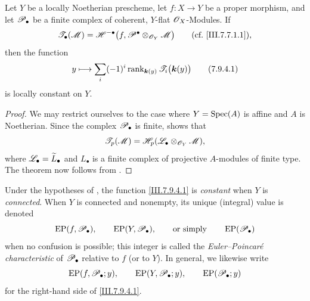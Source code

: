 \begin{theorem}[7.9.4]
\label{III.7.9.4}
Let $Y$ be a locally Noetherian prescheme, let
$f:X\to Y$ be a proper morphism, and let
$\mathscr{P}_\bullet$ be a finite complex of coherent,
$Y$-flat $\mathscr{O}_X$-Modules.  If
\[
  \mathscr{T}_\bullet(\mathscr{M})
  =
  \mathscr{H}^{-\bullet}
    \bigl(f,\mathscr{P}^\bullet
      \otimes_{\mathscr{O}_Y}\mathscr{M}\bigr)
  \qquad\text{\rm(cf.~\eqref{III.7.7.1.1})},
\]
then the function
\[
  y\longmapsto
  \sum_i(-1)^i
    \operatorname{rank}_{\boldsymbol{k}(y)}
      \mathscr{T}_i\bigl(\boldsymbol{k}(y)\bigr)
  \tag{7.9.4.1}\label{III.7.9.4.1}
\]
is locally constant on $Y$.
\end{theorem}

\begin{proof}
We may restrict ourselves to the case where
$Y=\operatorname{Spec}(A)$ is affine and $A$ is Noetherian.  Since the
complex $\mathscr{P}_\bullet$ is finite, 
shows that
\[
  \mathscr{T}_p(\mathscr{M})
  =
  \mathscr{H}_p(\mathscr{L}_\bullet\otimes_{\mathscr{O}_Y}\mathscr{M}),
\]
where $\mathscr{L}_\bullet=\widetilde{L}_\bullet$ and
$L_\bullet$ is a finite complex of projective $A$-modules
of finite type.  The theorem now follows from
.
\end{proof}

\begin{env}[7.9.5]
\label{III.7.9.5}
Under the hypotheses of , the function
\eqref{III.7.9.4.1} is \emph{constant} when $Y$ is
\emph{connected}.  When $Y$ is connected and nonempty, its
unique (integral) value is denoted
\[
  \operatorname{EP}(f,\mathscr{P}_\bullet),\qquad
  \operatorname{EP}(Y,\mathscr{P}_\bullet),
  \qquad\text{or simply}\qquad
  \operatorname{EP}(\mathscr{P}_\bullet)
\]
when no confusion is possible; this integer is called the
\emph{Euler--Poincar\'e characteristic} of
$\mathscr{P}_\bullet$ relative to $f$ (or to $Y$).  In general,
we likewise write
\[
  \operatorname{EP}(f,\mathscr{P}_\bullet;y),\qquad
  \operatorname{EP}(Y,\mathscr{P}_\bullet;y),\qquad
  \operatorname{EP}(\mathscr{P}_\bullet;y)
\]
for the right-hand side of \eqref{III.7.9.4.1}.
\end{env}

